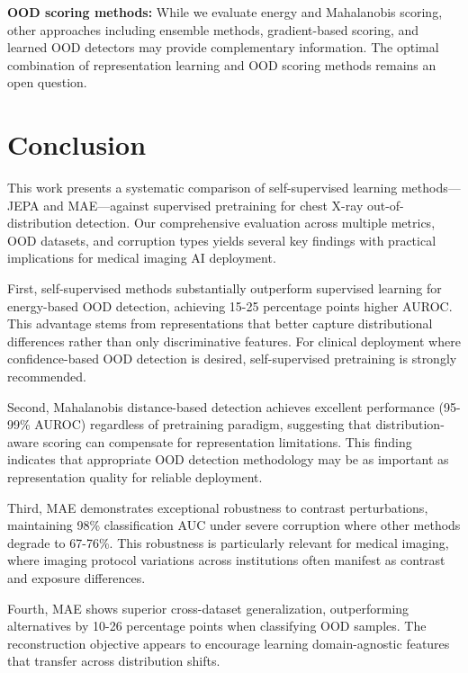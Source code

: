 \documentclass[11pt,a4paper]{article}
\begin{document}
\textbf{OOD scoring methods:} While we evaluate energy and Mahalanobis scoring, other approaches including ensemble methods, gradient-based scoring, and learned OOD detectors may provide complementary information. The optimal combination of representation learning and OOD scoring methods remains an open question.

\section{Conclusion}

This work presents a systematic comparison of self-supervised learning methods—JEPA and MAE—against supervised pretraining for chest X-ray out-of-distribution detection. Our comprehensive evaluation across multiple metrics, OOD datasets, and corruption types yields several key findings with practical implications for medical imaging AI deployment.

First, self-supervised methods substantially outperform supervised learning for energy-based OOD detection, achieving 15-25 percentage points higher AUROC. This advantage stems from representations that better capture distributional differences rather than only discriminative features. For clinical deployment where confidence-based OOD detection is desired, self-supervised pretraining is strongly recommended.

Second, Mahalanobis distance-based detection achieves excellent performance (95-99\% AUROC) regardless of pretraining paradigm, suggesting that distribution-aware scoring can compensate for representation limitations. This finding indicates that appropriate OOD detection methodology may be as important as representation quality for reliable deployment.

Third, MAE demonstrates exceptional robustness to contrast perturbations, maintaining 98\% classification AUC under severe corruption where other methods degrade to 67-76\%. This robustness is particularly relevant for medical imaging, where imaging protocol variations across institutions often manifest as contrast and exposure differences.

Fourth, MAE shows superior cross-dataset generalization, outperforming alternatives by 10-26 percentage points when classifying OOD samples. The reconstruction objective appears to encourage learning domain-agnostic features that transfer across distribution shifts.
\end{document}
